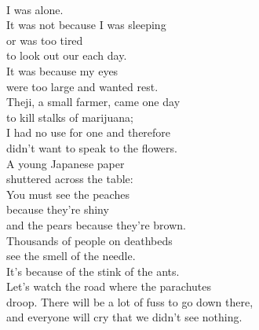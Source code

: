 \documentclass[smalldemyvopaper,11pt,twoside,onecolumn,openright,extrafontsizes]{memoir}
\begin{document}
\\I was alone.
\\It was not because I was sleeping
\\or was too tired
\\to look out our each day.
\\It was because my eyes
\\were too large and wanted rest.
\\Theji, a small farmer, came one day
\\to kill stalks of marijuana;
\\I had no use for one and therefore
\\didn't want to speak to the flowers.
\\A young Japanese paper
\\shuttered across the table:
\\You must see the peaches
\\because they're shiny
\\and the pears because they're brown.
\\Thousands of people on deathbeds
\\see the smell of the needle.
\\It's because of the stink of the ants.
\\Let's watch the road where the parachutes
\\droop. There will be a lot of fuss to go down there,
\\and everyone will cry that we didn't see nothing.
\end{document}
